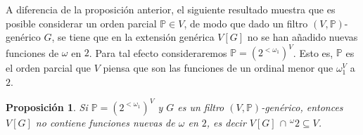 \documentclass[11pt]{unam_tesis1}
\theoremstyle{MyThmStyle}
\theoremstyle{definition}
\theoremstyle{plain}
\newtheorem{proposition}[definition]{Proposici\'on}
\theoremstyle{remark}
\begin{document}
A diferencia de la proposici\'on anterior, el siguiente resultado muestra que es posible considerar un orden parcial $\mathbb P\in V$, de modo que dado un filtro $(V,\mathbb P)$-gen\'erico $G$, se tiene que en la extensi\'on gen\'erica $V[G]$ no se han a\~nadido nuevas funciones de $\omega$ en $2$. Para tal efecto consideraremos $\mathbb P=(2^{<\omega_1})^V$. Esto es, $\mathbb P$ es el orden parcial que $V$ piensa que son las funciones de un ordinal menor que $\omega_1^V$ a $2$.

\begin{proposition}\label{nadanuevo}
Si $\mathbb P=(2^{<\omega_1})^V$ y $G$ es un filtro $(V,\mathbb P)$-gen\'erico, entonces $V[G]$ no contiene funciones nuevas de $\omega$ en $2$, es decir $V[G]$ $\cap$ $^{\omega}2\subseteq V$.
\end{proposition}
\end{document}
